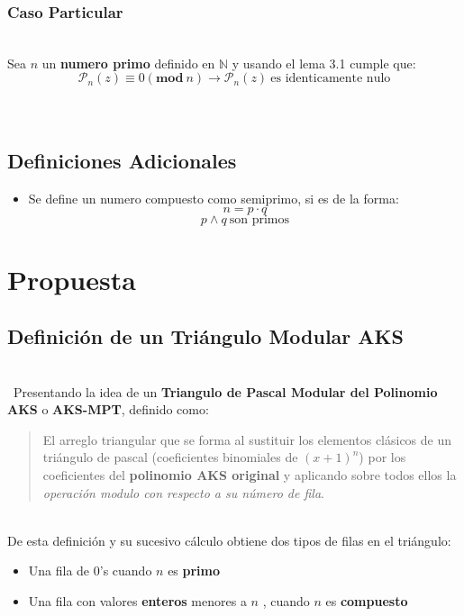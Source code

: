 \documentclass[a4paper, 12pt]{article}
\begin{document}
\subsubsection{Caso Particular}
\ \\
Sea $n$ un \textbf{numero primo} definido en $\mathbb{N}$ y usando el lema 3.1 \cite[pag. 4]{AKS}
cumple que:
\[ \mathcal{P}_{n}(z) \equiv0(\mathbf{mod}\ n) \rightarrow \mathcal{P}_{n}(z)\  \text{es identicamente nulo} \]
\\
\
\subsection{Definiciones Adicionales}
\begin{itemize}
	\item Se define un numero compuesto como semiprimo, si es de la forma:
	\[n = p \cdot q\]
	\[p \land q \  \text{son primos} \]
\end{itemize}
\section{Propuesta}
\subsection{Definición de un Triángulo Modular AKS}
\ \\
\
Presentando la idea de un \textbf{Triangulo de Pascal Modular del Polinomio AKS} o \textbf{AKS-MPT}, definido como:

\begin{verse}
	El arreglo triangular que se forma al sustituir los elementos clásicos de un triángulo de pascal (coeficientes binomiales de $(x+1)^{n}$) por los coeficientes del \textbf{polinomio AKS original} y aplicando sobre todos ellos la \emph{operación modulo con respecto a su número de fila}.
\end{verse}
\ \\
De esta definición y su sucesivo cálculo obtiene dos tipos de filas en el triángulo:
\begin{itemize}
	\item Una fila de $0$'s cuando $n$ es \textbf{primo}
	\item Una fila con valores \textbf{enteros} menores a $n$ , cuando $n$ es \textbf{compuesto}
\end{itemize}\
\end{document}
